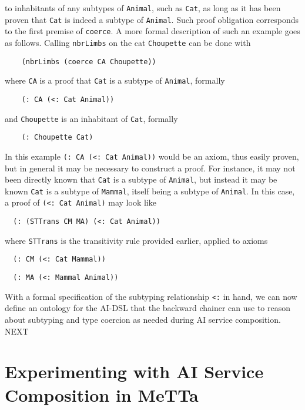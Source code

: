 \documentclass[]{report}
\begin{document}
\begin{enumerate}
  to inhabitants of any subtypes of \texttt{Animal}, such
  as \texttt{Cat}, as long as it has been proven that
  \texttt{Cat} is indeed a subtype of
  \texttt{Animal}.  Such proof obligation corresponds to
  the first premise of \texttt{coerce}.  A more formal
  description of such an example goes as follows.  Calling
  \texttt{nbrLimbs} on the cat \texttt{Choupette}
  can be done with
  \begin{verbatim}
    (nbrLimbs (coerce CA Choupette))
  \end{verbatim}
  where \texttt{CA} is a proof that
  \texttt{Cat} is a subtype of
  \texttt{Animal}, formally
  \begin{verbatim}
    (: CA (<: Cat Animal))
  \end{verbatim}
  and \texttt{Choupette} is an inhabitant of
  \texttt{Cat}, formally
  \begin{verbatim}
    (: Choupette Cat)
  \end{verbatim}
  In this example \texttt{(: CA (<: Cat Animal))} would be
  an axiom, thus easily proven, but in general it may be necessary to
  construct a proof.  For instance, it may not been directly known
  that \texttt{Cat} is a subtype of
  \texttt{Animal}, but instead it may be known
  \texttt{Cat} is a subtype of
  \texttt{Mammal}, itself being a subtype of
  \texttt{Animal}.  In this case, a proof of
  \texttt{(<: Cat Animal)} may look like
  \begin{verbatim}
  (: (STTrans CM MA) (<: Cat Animal))
  \end{verbatim}
  where \texttt{STTrans} is the transitivity rule provided
  earlier, applied to axioms
  \begin{verbatim}
  (: CM (<: Cat Mammal))
  \end{verbatim}
  \begin{verbatim}
  (: MA (<: Mammal Animal))
  \end{verbatim}
\end{enumerate}
With a formal specification of the subtyping relationship
\texttt{<:} in hand, we can now define an ontology for the
AI-DSL that the backward chainer can use to reason about subtyping and
type coercion as needed during AI service composition.  NEXT

\chapter{Experimenting with AI Service Composition in MeTTa}
\label{chap:xpaicompo}
\end{document}
